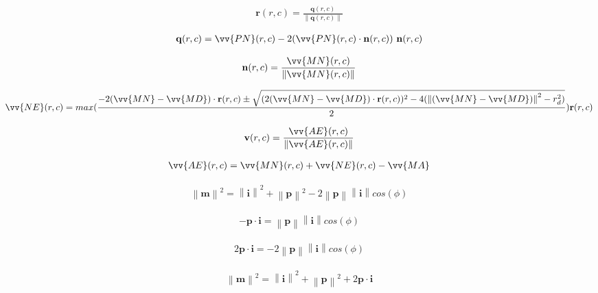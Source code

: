 \documentclass[10pt,letterpaper]{article}
\newcommand{\norm}[1]{\left\lVert#1\right\rVert}
\renewcommand{\vector}[1]{\mathbf{#1}}
\begin{document}
\begin{eqnarray}
\label{eq:5}
  \vector{r}(r,c) = \frac{\vector{q}(r,c)}{\norm{\vector{q}(r,c)}}
\end{eqnarray}

\begin{eqnarray}
\label{eq:6}
  \vector{q}(r,c) = \vv{PN}(r,c) -
        2(\vv{PN}(r,c)\cdot\vector{n}(r,c))\ \vector{n}(r,c)
\end{eqnarray}

\begin{eqnarray}
\label{eq:7}
  \vector{n}(r,c) = \frac{\vv{MN}(r,c)}{\norm{\vv{MN}(r,c)}}
\end{eqnarray}

\begin{eqnarray}
\label{eq:8}
  \vv{NE}(r,c) = max(\frac{-2(\vv{MN} - \vv{MD})\cdot\vector{r}(r,c)\pm
        \sqrt{(2(\vv{MN} - \vv{MD})\cdot\vector{r}(r,c))^2 - 4(\norm{(\vv{MN} -
        \vv{MD})}^2 - r_d^2)}}{2})\vector{r}(r,c)
\end{eqnarray}

\begin{eqnarray}
\label{eq:9}
  \vector{v}(r,c) = \frac{\vv{AE}(r,c)}{\norm{\vv{AE}(r,c)}}
\end{eqnarray}

\begin{eqnarray}
\label{eq:10}
  \vv{AE}(r,c) = \vv{MN}(r,c) + \vv{NE}(r,c) - \vv{MA}
\end{eqnarray}

\begin{eqnarray}
\label{eq:lawofcosines}
  \norm{\vector{m}}^2 = \norm{\vector{i}}^2 + \norm{\vector{p}}^2 -
  2\norm{\vector{p}}\norm{\vector{i}}cos(\phi) 
\end{eqnarray}

\begin{eqnarray}
\label{eq:dotproduct}
  -\vector{p} \cdot \vector{i} = \norm{\vector{p}} \norm{\vector{i}} cos(\phi)
\end{eqnarray}

\begin{eqnarray}
\label{eq:dotproduct2}
  2\vector{p} \cdot \vector{i} = -2\norm{\vector{p}} \norm{\vector{i}} cos(\phi)
\end{eqnarray}

\begin{eqnarray}
\label{eq:lawofcosines2}
  \norm{\vector{m}}^2 = \norm{\vector{i}}^2 + \norm{\vector{p}}^2
  + 2\vector{p} \cdot \vector{i}
\end{eqnarray}
\end{document}
